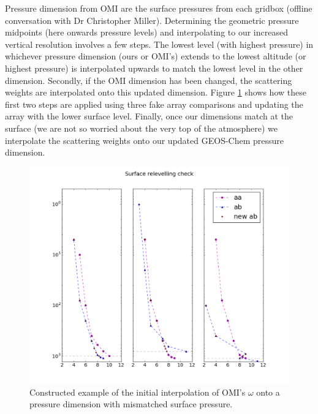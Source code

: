     Pressure dimension from OMI are the surface pressures from each gridbox (offline conversation with Dr Christopher Miller).
    Determining the geometric pressure midpoints (here onwards pressure levels) and interpolating to our increased vertical resolution involves a few steps.
    The lowest level (with highest pressure) in whichever pressure dimension (ours or OMI's) extends to the lowest altitude (or highest pressure) is interpolated upwards to match the lowest level in the other dimension.
    Secondly, if the OMI dimension has been changed, the scattering weights are interpolated onto this updated dimension.
    Figure \ref{ch_HCHO:fig:AMF_Surface_Relevel} shows how these first two steps are applied using three fake array comparisons and updating the array with the lower surface level.
    Finally, once our dimensions match at the surface (we are not so worried about the very top of the atmosphere) we interpolate the scattering weights onto our updated GEOS-Chem pressure dimension.
    
    \begin{figure}[!htbp]
      \includegraphics[width=\textwidth]{Figures/HCHO/SurfaceRelevelCheck.png}
      \caption{Constructed example of the initial interpolation of OMI's $\omega$ onto a pressure dimension with mismatched surface pressure.}
      \label{ch_HCHO:fig:AMF_Surface_Relevel}
    \end{figure}
    

